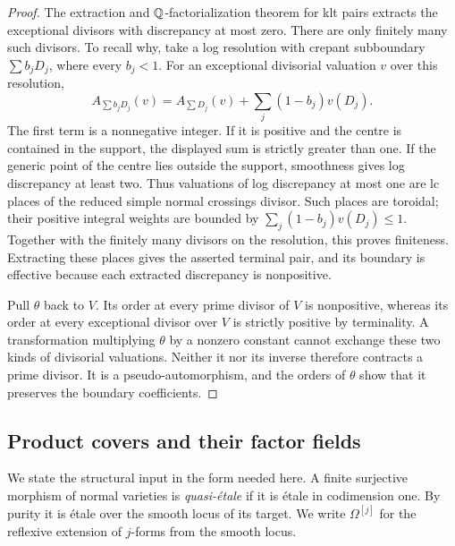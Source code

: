 \begin{proof}
The extraction and $\mathbb Q$-factorialization theorem for klt pairs
\citep[Corollary~1.4.3]{BCHM2010} extracts the exceptional divisors
with discrepancy at most zero.  There are only finitely many such
divisors.  To recall why, take a log resolution with crepant
subboundary $\sum b_jD_j$, where every $b_j<1$.  For an exceptional
divisorial valuation $v$ over this resolution,
\[
 A_{\sum b_jD_j}(v)
 =A_{\sum D_j}(v)+\sum_j(1-b_j)v(D_j).
\]
The first term is a nonnegative integer.  If it is positive and the
centre is contained in the support, the displayed sum is strictly
greater than one.  If the generic point of the centre lies outside
the support, smoothness gives log discrepancy at least two.  Thus valuations of log discrepancy at most
one are lc places of the reduced simple normal crossings divisor.
Such places are toroidal; their positive integral weights are bounded
by $\sum_j(1-b_j)v(D_j)\leq1$.  Together with the finitely many
divisors on the resolution, this proves finiteness.  Extracting these
places gives the asserted terminal pair, and its boundary is
effective because each extracted discrepancy is nonpositive.

Pull $\theta$ back to $V$.  Its order at every prime divisor of $V$
is nonpositive, whereas its order at every exceptional divisor over
$V$ is strictly positive by terminality.  A transformation multiplying
$\theta$ by a nonzero constant cannot exchange these two kinds of
divisorial valuations.  Neither it nor its inverse therefore
contracts a prime divisor.  It is a pseudo-automorphism, and the
orders of $\theta$ show that it preserves the boundary coefficients.
\end{proof}

\subsection{Product covers and their factor fields}

We state the structural input in the form needed here.  A finite
surjective morphism of normal varieties is \emph{quasi-\'etale} if
it is \'etale in codimension one.  By purity it is \'etale over the
smooth locus of its target.  We write $\Omega^{[j]}$ for the
reflexive extension of $j$-forms from the smooth locus.

